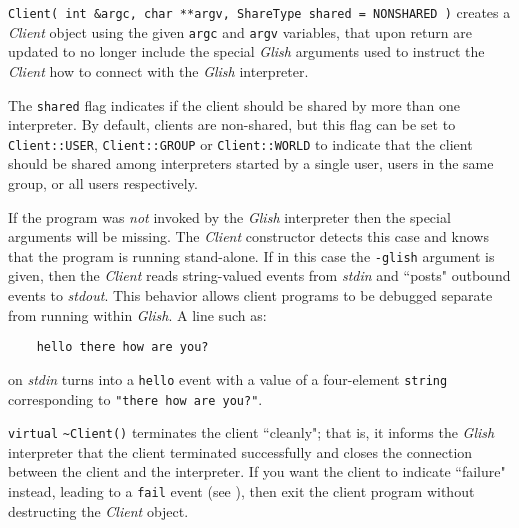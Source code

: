 \begin{sloppy}
\begin{list}{}{}

\item[{\tt Client( int \&argc, char **argv, ShareType shared = NONSHARED )}]
creates
\label{client-argv-ctor}
a {\em Client} object
using the given {\tt argc} and {\tt argv} variables, that upon return
are updated to no longer include the special {\em Glish} arguments used to
instruct the {\em Client} how to connect with the {\em Glish} interpreter.

The {\tt shared} flag
indicates if the client should be shared by more than one interpreter.
By default, clients are non-shared, but this flag can be set to
\verb+Client::USER+, \verb+Client::GROUP+ or \verb+Client::WORLD+ to
indicate that the client should be shared among interpreters started
by a single user, users in the same group, or all users respectively.

\label{standalone}
If the program was {\em not} invoked by the {\em Glish} 
interpreter then the
special arguments will be missing.  The {\em Client} constructor detects
this case and knows that the program is running stand-alone.  If in this
case the {\tt -glish} argument is given, then the {\em Client}
reads string-valued events from {\em stdin} and ``posts"
outbound events to {\em stdout\/}.  This behavior allows client
programs to be debugged separate from running within {\em Glish}.  A line
such as:
\begin{verbatim}
    hello there how are you?
\end{verbatim}
on {\em stdin} turns into a {\tt hello} event with a value
of a four-element {\tt string} corresponding to {\tt "there how are you?"}.

\item[{\tt virtual}] \verb+~+{\tt Client()}
terminates the client ``cleanly"; that is,
it informs the {\em Glish} interpreter that the client terminated successfully
and closes the connection between the client and the interpreter.  If
you want the client to indicate ``failure" instead, leading to a
{\tt fail} event (see ), then exit the client
program without destructing the {\em Client} object.


\end{list}
\end{sloppy}
